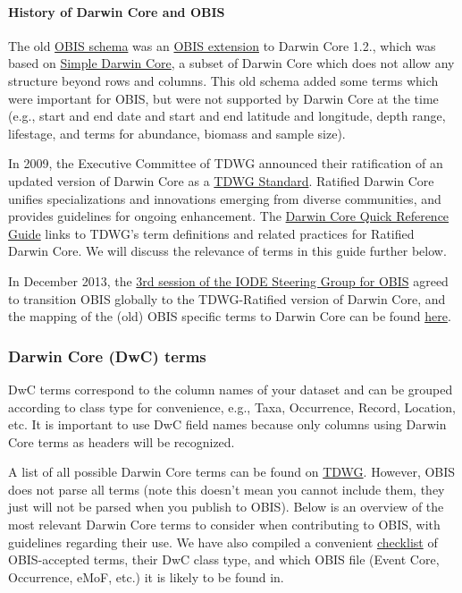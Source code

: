 \documentclass[
  letterpaper,
  DIV=11,
  numbers=noendperiod,
  oneside]{scrreprt}
\let\oldparagraph\paragraph
\renewcommand{\paragraph}[1]{\oldparagraph{#1}\mbox{}}
\begin{document}
\hypertarget{history-of-darwin-core-and-obis}{%
\paragraph{History of Darwin Core and
OBIS}\label{history-of-darwin-core-and-obis}}

The old \href{http://old.iobis.org/node/304}{OBIS schema} was an
\href{http://old.iobis.org/obis/obis.xsd}{OBIS extension} to Darwin Core
1.2., which was based on
\href{http://rs.tdwg.org/dwc/terms/simple/}{Simple Darwin Core}, a
subset of Darwin Core which does not allow any structure beyond rows and
columns. This old schema added some terms which were important for OBIS,
but were not supported by Darwin Core at the time (e.g., start and end
date and start and end latitude and longitude, depth range, lifestage,
and terms for abundance, biomass and sample size).

In 2009, the Executive Committee of TDWG announced their ratification of
an updated version of Darwin Core as a
\href{https://www.tdwg.org/community/dwc/\#history-and-context}{TDWG
Standard}. Ratified Darwin Core unifies specializations and innovations
emerging from diverse communities, and provides guidelines for ongoing
enhancement. The \href{https://dwc.tdwg.org/terms/}{Darwin Core Quick
Reference Guide} links to TDWG's term definitions and related practices
for Ratified Darwin Core. We will discuss the relevance of terms in this
guide further below.

In December 2013, the \href{https://obis.org/about/}{3rd session of the
IODE Steering Group for OBIS} agreed to transition OBIS globally to the
TDWG-Ratified version of Darwin Core, and the mapping of the (old) OBIS
specific terms to Darwin Core can be found
\href{http://rs.tdwg.org/dwc/terms/history/versions/index.htm\#dwcobis}{here}.

\hypertarget{darwin-core-dwc-terms}{%
\subsubsection{Darwin Core (DwC) terms}\label{darwin-core-dwc-terms}}

DwC terms correspond to the column names of your dataset and can be
grouped according to class type for convenience, e.g., Taxa, Occurrence,
Record, Location, etc. It is important to use DwC field names because
only columns using Darwin Core terms as headers will be recognized.

A list of all possible Darwin Core terms can be found on
\href{https://dwc.tdwg.org/terms/}{TDWG}. However, OBIS does not parse
all terms (note this doesn't mean you cannot include them, they just
will not be parsed when you publish to OBIS). Below is an overview of
the most relevant Darwin Core terms to consider when contributing to
OBIS, with guidelines regarding their use. We have also compiled a
convenient \href{checklist.html}{checklist} of OBIS-accepted terms,
their DwC class type, and which OBIS file (Event Core, Occurrence, eMoF,
etc.) it is likely to be found in.
\end{document}

